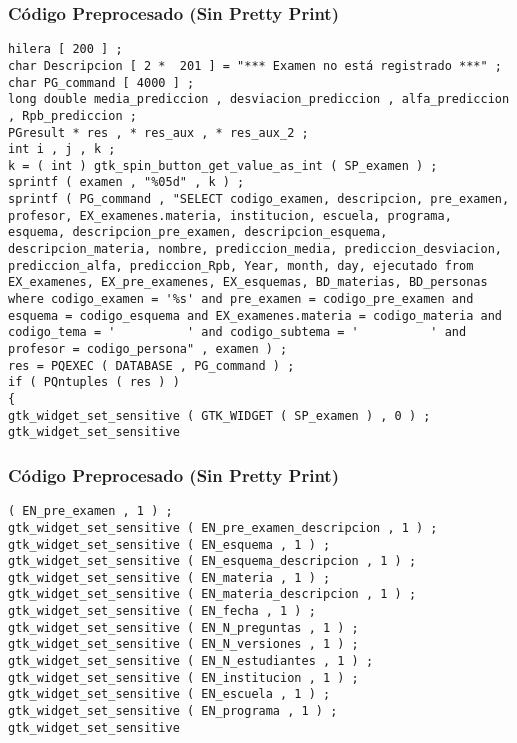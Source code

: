\documentclass{beamer}
\begin{document}
\begin{frame}[fragile]
\frametitle{C\'odigo Preprocesado (Sin Pretty Print)}
\begin{lstlisting}[style=CStyle]
hilera [ 200 ] ; 
char Descripcion [ 2 *  201 ] = "*** Examen no está registrado ***" ; 
char PG_command [ 4000 ] ; 
long double media_prediccion , desviacion_prediccion , alfa_prediccion , Rpb_prediccion ; 
PGresult * res , * res_aux , * res_aux_2 ; 
int i , j , k ; 
k = ( int ) gtk_spin_button_get_value_as_int ( SP_examen ) ; 
sprintf ( examen , "%05d" , k ) ; 
sprintf ( PG_command , "SELECT codigo_examen, descripcion, pre_examen, profesor, EX_examenes.materia, institucion, escuela, programa, esquema, descripcion_pre_examen, descripcion_esquema, descripcion_materia, nombre, prediccion_media, prediccion_desviacion, prediccion_alfa, prediccion_Rpb, Year, month, day, ejecutado from EX_examenes, EX_pre_examenes, EX_esquemas, BD_materias, BD_personas where codigo_examen = '%s' and pre_examen = codigo_pre_examen and esquema = codigo_esquema and EX_examenes.materia = codigo_materia and codigo_tema = '          ' and codigo_subtema = '          ' and profesor = codigo_persona" , examen ) ; 
res = PQEXEC ( DATABASE , PG_command ) ; 
if ( PQntuples ( res ) ) 
{ 
gtk_widget_set_sensitive ( GTK_WIDGET ( SP_examen ) , 0 ) ; 
gtk_widget_set_sensitive \end{lstlisting}
\end{frame}
\begin{frame}[fragile]
\frametitle{C\'odigo Preprocesado (Sin Pretty Print)}
\begin{lstlisting}[style=CStyle]
( EN_pre_examen , 1 ) ; 
gtk_widget_set_sensitive ( EN_pre_examen_descripcion , 1 ) ; 
gtk_widget_set_sensitive ( EN_esquema , 1 ) ; 
gtk_widget_set_sensitive ( EN_esquema_descripcion , 1 ) ; 
gtk_widget_set_sensitive ( EN_materia , 1 ) ; 
gtk_widget_set_sensitive ( EN_materia_descripcion , 1 ) ; 
gtk_widget_set_sensitive ( EN_fecha , 1 ) ; 
gtk_widget_set_sensitive ( EN_N_preguntas , 1 ) ; 
gtk_widget_set_sensitive ( EN_N_versiones , 1 ) ; 
gtk_widget_set_sensitive ( EN_N_estudiantes , 1 ) ; 
gtk_widget_set_sensitive ( EN_institucion , 1 ) ; 
gtk_widget_set_sensitive ( EN_escuela , 1 ) ; 
gtk_widget_set_sensitive ( EN_programa , 1 ) ; 
gtk_widget_set_sensitive \end{lstlisting}
\end{frame}
\end{document}
